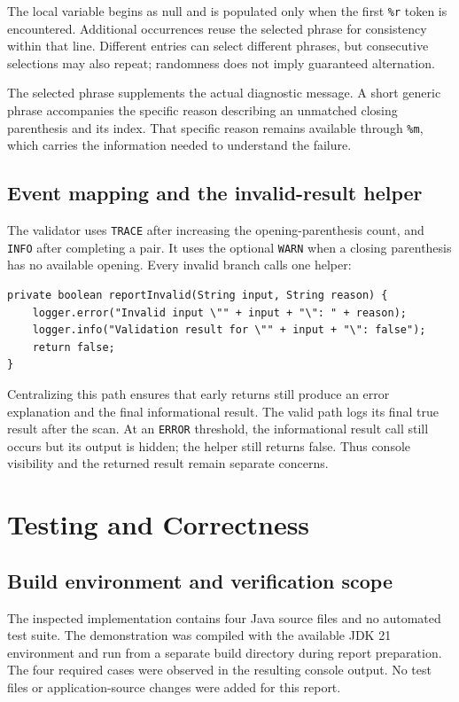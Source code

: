 \documentclass[12pt,a4paper]{article}
\newcommand{\code}[1]{\texttt{#1}}
\begin{document}
The local variable begins as null and is populated only when the first \code{\%r} token is encountered. Additional occurrences reuse the selected phrase for consistency within that line. Different entries can select different phrases, but consecutive selections may also repeat; randomness does not imply guaranteed alternation.

The selected phrase supplements the actual diagnostic message. A short generic phrase accompanies the specific reason describing an unmatched closing parenthesis and its index. That specific reason remains available through \code{\%m}, which carries the information needed to understand the failure.

\subsection{Event mapping and the invalid-result helper}
The validator uses \code{TRACE} after increasing the opening-parenthesis count, and \code{INFO} after completing a pair. It uses the optional \code{WARN} when a closing parenthesis has no available opening. Every invalid branch calls one helper:

\begin{samepage}
\begin{lstlisting}
private boolean reportInvalid(String input, String reason) {
    logger.error("Invalid input \"" + input + "\": " + reason);
    logger.info("Validation result for \"" + input + "\": false");
    return false;
}
\end{lstlisting}
\end{samepage}

Centralizing this path ensures that early returns still produce an error explanation and the final informational result. The valid path logs its final true result after the scan. At an \code{ERROR} threshold, the informational result call still occurs but its output is hidden; the helper still returns false. Thus console visibility and the returned result remain separate concerns.

\section{Testing and Correctness}
\subsection{Build environment and verification scope}
The inspected implementation contains four Java source files and no automated test suite. The demonstration was compiled with the available JDK 21 environment and run from a separate build directory during report preparation. The four required cases were observed in the resulting console output. No test files or application-source changes were added for this report.
\end{document}
